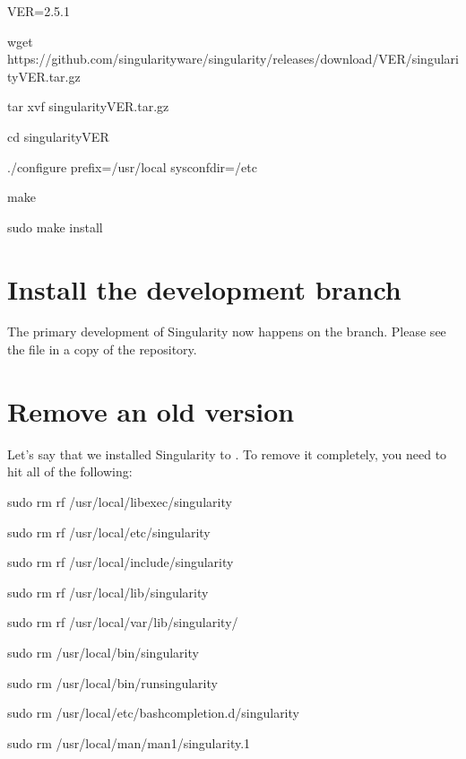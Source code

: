 \documentclass[letterpaper,10pt,english]{sphinxmanual}
\begin{document}
%
\begin{sphinxVerbatim}[commandchars=\\\{\}]
\PYGZdl{} VER=2.5.1

\PYGZdl{} wget https://github.com/singularityware/singularity/releases/download/\PYGZdl{}VER/singularity\PYGZhy{}\PYGZdl{}VER.tar.gz

\PYGZdl{} tar xvf singularity\PYGZhy{}\PYGZdl{}VER.tar.gz

\PYGZdl{} cd singularity\PYGZhy{}\PYGZdl{}VER

\PYGZdl{} ./configure \PYGZhy{}\PYGZhy{}prefix=/usr/local \PYGZhy{}\PYGZhy{}sysconfdir=/etc

\PYGZdl{} make

\PYGZdl{} sudo make install
\end{sphinxVerbatim}


\section{Install the development branch}
\label{\detokenize{installation:install-the-development-branch}}
The primary development of Singularity now happens on the  branch.
Please see the  file in a copy of the repository.


\section{Remove an old version}
\label{\detokenize{installation:remove-an-old-version}}
Let’s say that we installed Singularity to . To remove it completely,
you need to hit all of the following:

%
\begin{sphinxVerbatim}[commandchars=\\\{\}]
\PYGZdl{} sudo rm \PYGZhy{}rf /usr/local/libexec/singularity

\PYGZdl{} sudo rm \PYGZhy{}rf /usr/local/etc/singularity

\PYGZdl{} sudo rm \PYGZhy{}rf /usr/local/include/singularity

\PYGZdl{} sudo rm \PYGZhy{}rf /usr/local/lib/singularity

\PYGZdl{} sudo rm \PYGZhy{}rf /usr/local/var/lib/singularity/

\PYGZdl{} sudo rm /usr/local/bin/singularity

\PYGZdl{} sudo rm /usr/local/bin/run\PYGZhy{}singularity

\PYGZdl{} sudo rm /usr/local/etc/bash\PYGZus{}completion.d/singularity

\PYGZdl{} sudo rm /usr/local/man/man1/singularity.1
\end{sphinxVerbatim}
\end{document}
